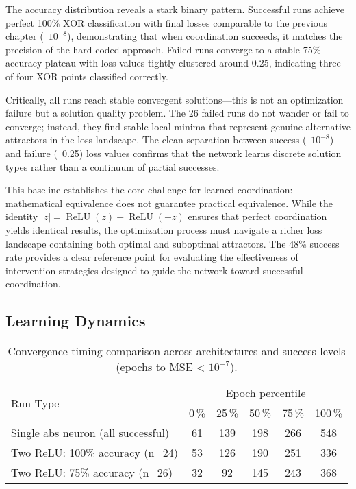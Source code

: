 The accuracy distribution reveals a stark binary pattern. Successful runs achieve perfect 100\% XOR classification with final losses comparable to the previous chapter (~$10^{-8}$), demonstrating that when coordination succeeds, it matches the precision of the hard-coded approach. Failed runs converge to a stable 75\% accuracy plateau with loss values tightly clustered around 0.25, indicating three of four XOR points classified correctly.

Critically, all runs reach stable convergent solutions—this is not an optimization failure but a solution quality problem. The 26 failed runs do not wander or fail to converge; instead, they find stable local minima that represent genuine alternative attractors in the loss landscape. The clean separation between success (~$10^{-8}$) and failure (~0.25) loss values confirms that the network learns discrete solution types rather than a continuum of partial successes.

This baseline establishes the core challenge for learned coordination: mathematical equivalence does not guarantee practical equivalence. While the identity $|z| = \operatorname{ReLU}(z) + \operatorname{ReLU}(-z)$ ensures that perfect coordination yields identical results, the optimization process must navigate a richer loss landscape containing both optimal and suboptimal attractors. The 48\% success rate provides a clear reference point for evaluating the effectiveness of intervention strategies designed to guide the network toward successful coordination.


\subsection*{Learning Dynamics}

\begin{table}[ht]
\centering
\caption{Convergence timing comparison across architectures and success levels (epochs to MSE < $10^{-7}$).}
\label{tab:relu1-baseline-timing}
\begin{tabular}{lccccc}
\toprule
\multirow{2}{*}{Run Type} &
\multicolumn{5}{c}{Epoch percentile} \\
\cmidrule(lr){2-6}
 & 0\,\% & 25\,\% & 50\,\% & 75\,\% & 100\,\% \\
\midrule
Single abs neuron (all successful) & 61 & 139 & 198 & 266 & 548 \\
Two ReLU: 100\% accuracy (n=24) & 53 & 126 & 190 & 251 & 336 \\
Two ReLU: 75\% accuracy (n=26) & 32 & 92 & 145 & 243 & 368 \\
\bottomrule
\end{tabular}
\end{table}

